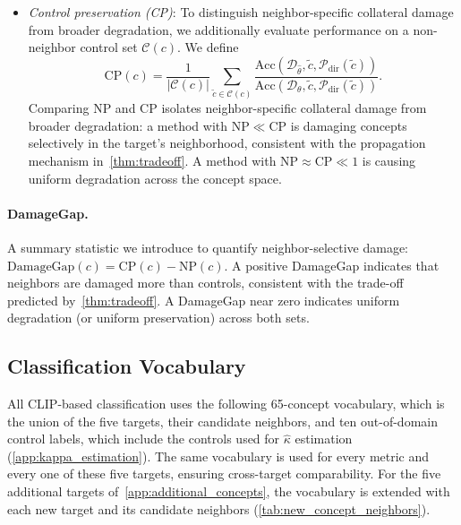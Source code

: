 \begin{itemize}
    \item \emph{Control preservation (CP)}: To distinguish neighbor-specific collateral damage from broader degradation, we additionally evaluate performance on a non-neighbor control set $\mathcal{C}(c)$. We define
    \begin{equation}
    \label{eq:cp}
    \mathrm{CP}(c) = \frac{1}{|\mathcal{C}(c)|} \sum_{\tilde c \in \mathcal{C}(c)} 
    \frac{\mathrm{Acc}(\mathcal{D}_{\hat\theta}, \tilde c, \mathcal{P}_{\mathrm{dir}}(\tilde c))}
     {\mathrm{Acc}(\mathcal{D}_\theta, \tilde c, \mathcal{P}_{\mathrm{dir}}(\tilde c))}.
    \end{equation}
    Comparing NP and CP isolates neighbor-specific collateral damage from broader degradation: a method with $\mathrm{NP} \ll \mathrm{CP}$ is damaging concepts selectively in the target's neighborhood, consistent with the propagation mechanism in~\cref{thm:tradeoff}. A method with $\mathrm{NP} \approx \mathrm{CP} \ll 1$ is causing uniform degradation across the concept space.
\end{itemize}




\paragraph{DamageGap.} A summary statistic we introduce to quantify neighbor-selective damage: $\mathrm{DamageGap}(c) = \mathrm{CP}(c) - \mathrm{NP}(c)$. A positive DamageGap indicates that neighbors are damaged more than controls, consistent with the trade-off predicted by~\cref{thm:tradeoff}. A DamageGap near zero indicates uniform degradation (or uniform preservation) across both sets.

\subsection{Classification Vocabulary}
\label{app:vocab}
All CLIP-based classification uses the following 65-concept vocabulary, which is the union of the five targets, their candidate neighbors, and ten out-of-domain control labels, which include the controls used for $\hat\kappa$ estimation (\cref{app:kappa_estimation}). The same vocabulary is used for every metric and every one of these five targets, ensuring cross-target comparability. For the five additional targets of~\cref{app:additional_concepts}, the vocabulary is extended with each new target and its candidate neighbors (\cref{tab:new_concept_neighbors}).

